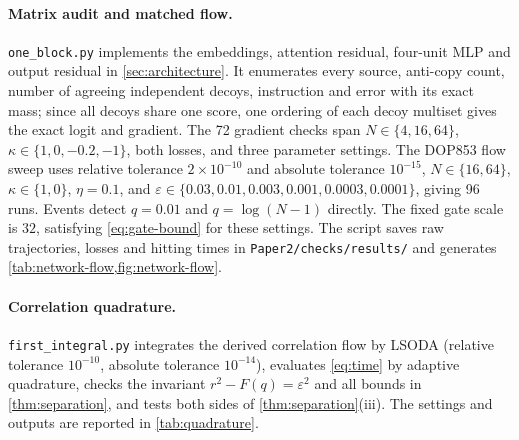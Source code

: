 \paragraph{Matrix audit and matched flow.}
\texttt{one\_block.py} implements the embeddings, attention residual, four-unit MLP and output residual in \cref{sec:architecture}.
It enumerates every source, anti-copy count, number of agreeing independent decoys, instruction and error with its exact mass;
since all decoys share one score, one ordering of each decoy multiset gives the exact logit and gradient.
The 72 gradient checks span $N\in\{4,16,64\}$, $\kappa\in\{1,0,-0.2,-1\}$, both losses, and three parameter settings.
The DOP853 flow sweep uses relative tolerance $2\times10^{-10}$ and absolute tolerance $10^{-15}$,
$N\in\{16,64\}$, $\kappa\in\{1,0\}$, $\eta=0.1$, and
$\varepsilon\in\{0.03,0.01,0.003,0.001,0.0003,0.0001\}$, giving 96 runs.
Events detect $q=0.01$ and $q=\log(N-1)$ directly.
The fixed gate scale is $32$, satisfying \cref{eq:gate-bound} for these settings.
The script saves raw trajectories, losses and hitting times in \texttt{Paper2/checks/results/} and generates \cref{tab:network-flow,fig:network-flow}.

\paragraph{Correlation quadrature.}
\texttt{first\_integral.py} integrates the derived correlation flow by LSODA
(relative tolerance $10^{-10}$, absolute tolerance $10^{-14}$), evaluates \cref{eq:time} by adaptive quadrature,
checks the invariant $r^2-F(q)=\varepsilon^2$ and all bounds in \cref{thm:separation}, and tests both sides of \cref{thm:separation}(iii).
The settings and outputs are reported in \cref{tab:quadrature}.

